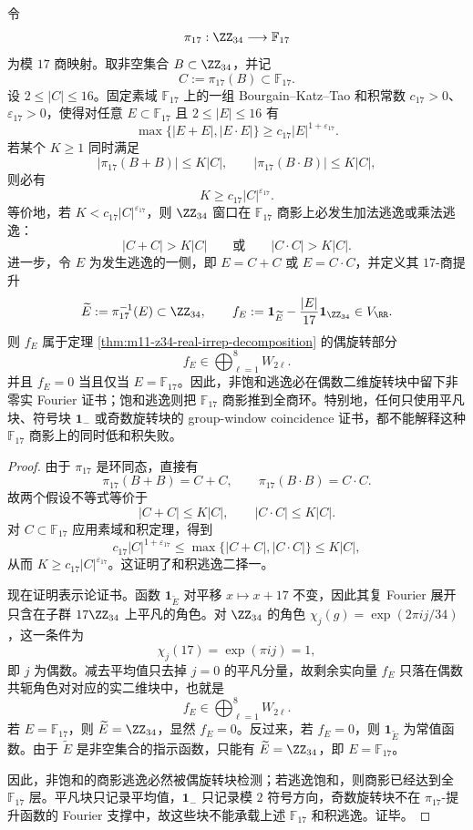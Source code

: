 \begin{theorem}\label{distill:bourgain-sum_product_obstruction_classification-z34-f17-quotient-expansion-even-rotation-escape}
令
\[
\pi_{17}:\ZZ_{34}\longrightarrow \mathbb F_{17}
\]
为模 \(17\) 商映射。取非空集合 \(B\subset\ZZ_{34}\)，并记
\[
C:=\pi_{17}(B)\subset\mathbb F_{17}.
\]
设 \(2\le |C|\le16\)。固定素域 \(\mathbb F_{17}\) 上的一组 Bourgain--Katz--Tao 和积常数 \(c_{17}>0\)、\(\varepsilon_{17}>0\)，使得对任意 \(E\subset\mathbb F_{17}\) 且 \(2\le |E|\le16\) 有
\[
\max\{|E+E|,|E\cdot E|\}\ge c_{17}|E|^{1+\varepsilon_{17}}.
\]
若某个 \(K\ge1\) 同时满足
\[
|\pi_{17}(B+B)|\le K|C|,
\qquad
|\pi_{17}(B\cdot B)|\le K|C|,
\]
则必有
\[
K\ge c_{17}|C|^{\varepsilon_{17}}.
\]
等价地，若 \(K<c_{17}|C|^{\varepsilon_{17}}\)，则 \(\ZZ_{34}\) 窗口在 \(\mathbb F_{17}\) 商影上必发生加法逃逸或乘法逃逸：
\[
|C+C|>K|C|
\qquad\text{或}\qquad
|C\cdot C|>K|C|.
\]
进一步，令 \(E\) 为发生逃逸的一侧，即 \(E=C+C\) 或 \(E=C\cdot C\)，并定义其 \(17\)-商提升
\[
\widetilde E:=\pi_{17}^{-1}(E)\subset\ZZ_{34},
\qquad
f_E:=\mathbf 1_{\widetilde E}-\frac{|E|}{17}\mathbf 1_{\ZZ_{34}}\in V_{\RR}.
\]
则 \(f_E\) 属于定理 \ref{thm:m11-z34-real-irrep-decomposition} 的偶旋转部分
\[
f_E\in \bigoplus_{\ell=1}^{8}W_{2\ell}.
\]
并且 \(f_E=0\) 当且仅当 \(E=\mathbb F_{17}\)。因此，非饱和逃逸必在偶数二维旋转块中留下非零实 Fourier 证书；饱和逃逸则把 \(\mathbb F_{17}\) 商影推到全商环。特别地，任何只使用平凡块、符号块 \(\mathbf 1_-\) 或奇数旋转块的 group-window coincidence 证书，都不能解释这种 \(\mathbb F_{17}\) 商影上的同时低和积失败。
\end{theorem}
\begin{proof}
由于 \(\pi_{17}\) 是环同态，直接有
\[
\pi_{17}(B+B)=C+C,
\qquad
\pi_{17}(B\cdot B)=C\cdot C.
\]
故两个假设不等式等价于
\[
|C+C|\le K|C|,
\qquad
|C\cdot C|\le K|C|.
\]
对 \(C\subset\mathbb F_{17}\) 应用素域和积定理，得到
\[
c_{17}|C|^{1+\varepsilon_{17}}
\le
\max\{|C+C|,|C\cdot C|\}
\le K|C|,
\]
从而 \(K\ge c_{17}|C|^{\varepsilon_{17}}\)。这证明了和积逃逸二择一。

现在证明表示论证书。函数 \(\mathbf 1_{\widetilde E}\) 对平移 \(x\mapsto x+17\) 不变，因此其复 Fourier 展开只含在子群 \(17\ZZ_{34}\) 上平凡的角色。对 \(\ZZ_{34}\) 的角色 \(\chi_j(g)=\exp(2\pi i j/34)\)，这一条件为
\[
\chi_j(17)=\exp(\pi i j)=1,
\]
即 \(j\) 为偶数。减去平均值只去掉 \(j=0\) 的平凡分量，故剩余实向量 \(f_E\) 只落在偶数共轭角色对对应的实二维块中，也就是
\[
f_E\in\bigoplus_{\ell=1}^{8}W_{2\ell}.
\]
若 \(E=\mathbb F_{17}\)，则 \(\widetilde E=\ZZ_{34}\)，显然 \(f_E=0\)。反过来，若 \(f_E=0\)，则 \(\mathbf 1_{\widetilde E}\) 为常值函数。由于 \(\widetilde E\) 是非空集合的指示函数，只能有 \(\widetilde E=\ZZ_{34}\)，即 \(E=\mathbb F_{17}\)。

因此，非饱和的商影逃逸必然被偶旋转块检测；若逃逸饱和，则商影已经达到全 \(\mathbb F_{17}\) 层。平凡块只记录平均值，\(\mathbf 1_-\) 只记录模 \(2\) 符号方向，奇数旋转块不在 \(\pi_{17}\)-提升函数的 Fourier 支撑中，故这些块不能承载上述 \(\mathbb F_{17}\) 和积逃逸。证毕。
\end{proof}
